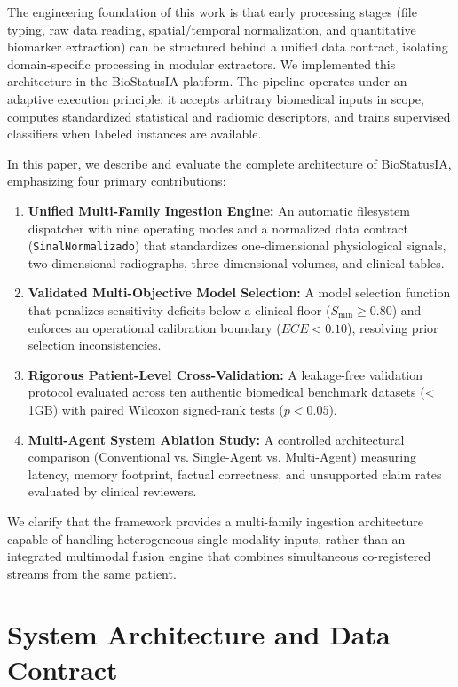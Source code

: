 \documentclass[conference]{IEEEtran}
\begin{document}
The engineering foundation of this work is that early processing stages (file typing, raw data reading, spatial/temporal normalization, and quantitative biomarker extraction) can be structured behind a unified data contract, isolating domain-specific processing in modular extractors. We implemented this architecture in the BioStatusIA platform. The pipeline operates under an adaptive execution principle: it accepts arbitrary biomedical inputs in scope, computes standardized statistical and radiomic descriptors, and trains supervised classifiers when labeled instances are available.

In this paper, we describe and evaluate the complete architecture of BioStatusIA, emphasizing four primary contributions:
\begin{enumerate}
    \item \textbf{Unified Multi-Family Ingestion Engine:} An automatic filesystem dispatcher with nine operating modes and a normalized data contract (\texttt{SinalNormalizado}) that standardizes one-dimensional physiological signals, two-dimensional radiographs, three-dimensional volumes, and clinical tables.
    \item \textbf{Validated Multi-Objective Model Selection:} A model selection function that penalizes sensitivity deficits below a clinical floor ($S_{\min} \ge 0.80$) and enforces an operational calibration boundary ($ECE < 0.10$), resolving prior selection inconsistencies.
    \item \textbf{Rigorous Patient-Level Cross-Validation:} A leakage-free validation protocol evaluated across ten authentic biomedical benchmark datasets (< 1GB) with paired Wilcoxon signed-rank tests ($p < 0.05$).
    \item \textbf{Multi-Agent System Ablation Study:} A controlled architectural comparison (Conventional vs. Single-Agent vs. Multi-Agent) measuring latency, memory footprint, factual correctness, and unsupported claim rates evaluated by clinical reviewers.
\end{enumerate}

We clarify that the framework provides a multi-family ingestion architecture capable of handling heterogeneous single-modality inputs, rather than an integrated multimodal fusion engine that combines simultaneous co-registered streams from the same patient.

\section{System Architecture and Data Contract}
\end{document}
